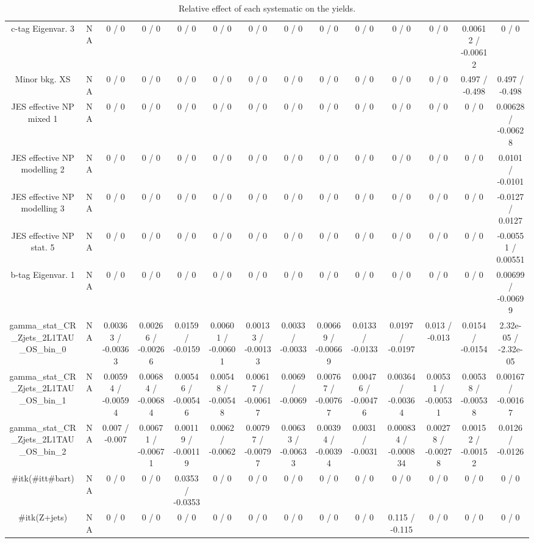 \documentclass[10pt]{article}
\begin{document}
\begin{table}[htbp]
\begin{center}
\begin{tabular}{|c|c|c|c|c|c|c|c|c|c|c|c|c|c|}
  c-tag Eigenvar. 3 &    NA    & 0 / 0 & 0 / 0 & 0 / 0 & 0 / 0 & 0 / 0 & 0 / 0 & 0 / 0 & 0 / 0 & 0 / 0 & 0 / 0 & 0.00612 / -0.00612 & 0 / 0 \\ 
  Minor bkg. XS &    NA    & 0 / 0 & 0 / 0 & 0 / 0 & 0 / 0 & 0 / 0 & 0 / 0 & 0 / 0 & 0 / 0 & 0 / 0 & 0 / 0 & 0.497 / -0.498 & 0.497 / -0.498 \\ 
  JES effective NP mixed 1 &    NA    & 0 / 0 & 0 / 0 & 0 / 0 & 0 / 0 & 0 / 0 & 0 / 0 & 0 / 0 & 0 / 0 & 0 / 0 & 0 / 0 & 0 / 0 & 0.00628 / -0.00628 \\ 
  JES effective NP modelling 2 &    NA    & 0 / 0 & 0 / 0 & 0 / 0 & 0 / 0 & 0 / 0 & 0 / 0 & 0 / 0 & 0 / 0 & 0 / 0 & 0 / 0 & 0 / 0 & 0.0101 / -0.0101 \\ 
  JES effective NP modelling 3 &    NA    & 0 / 0 & 0 / 0 & 0 / 0 & 0 / 0 & 0 / 0 & 0 / 0 & 0 / 0 & 0 / 0 & 0 / 0 & 0 / 0 & 0 / 0 & -0.0127 / 0.0127 \\ 
  JES effective NP stat. 5 &    NA    & 0 / 0 & 0 / 0 & 0 / 0 & 0 / 0 & 0 / 0 & 0 / 0 & 0 / 0 & 0 / 0 & 0 / 0 & 0 / 0 & 0 / 0 & -0.00551 / 0.00551 \\ 
  b-tag Eigenvar. 1 &    NA    & 0 / 0 & 0 / 0 & 0 / 0 & 0 / 0 & 0 / 0 & 0 / 0 & 0 / 0 & 0 / 0 & 0 / 0 & 0 / 0 & 0 / 0 & 0.00699 / -0.00699 \\ 
  gamma_stat_CR_Zjets_2L1TAU_OS_bin_0 &    NA    & 0.00363 / -0.00363 & 0.00266 / -0.00266 & 0.0159 / -0.0159 & 0.00601 / -0.00601 & 0.00133 / -0.00133 & 0.0033 / -0.0033 & 0.00669 / -0.00669 & 0.0133 / -0.0133 & 0.0197 / -0.0197 & 0.013 / -0.013 & 0.0154 / -0.0154 & 2.32e-05 / -2.32e-05 \\ 
  gamma_stat_CR_Zjets_2L1TAU_OS_bin_1 &    NA    & 0.00594 / -0.00594 & 0.00684 / -0.00684 & 0.00546 / -0.00546 & 0.00548 / -0.00548 & 0.00617 / -0.00617 & 0.0069 / -0.0069 & 0.00767 / -0.00767 & 0.00476 / -0.00476 & 0.00364 / -0.00364 & 0.00531 / -0.00531 & 0.00538 / -0.00538 & 0.00167 / -0.00167 \\ 
  gamma_stat_CR_Zjets_2L1TAU_OS_bin_2 &    NA    & 0.007 / -0.007 & 0.00671 / -0.00671 & 0.00119 / -0.00119 & 0.0062 / -0.0062 & 0.00797 / -0.00797 & 0.00633 / -0.00633 & 0.00394 / -0.00394 & 0.0031 / -0.0031 & 0.000834 / -0.000834 & 0.00278 / -0.00278 & 0.00152 / -0.00152 & 0.0126 / -0.0126 \\ 
  #it{k}(#it{t#bar{t}}) &    NA    & 0 / 0 & 0 / 0 & 0.0353 / -0.0353 & 0 / 0 & 0 / 0 & 0 / 0 & 0 / 0 & 0 / 0 & 0 / 0 & 0 / 0 & 0 / 0 & 0 / 0 \\ 
  #it{k}(Z+jets) &    NA    & 0 / 0 & 0 / 0 & 0 / 0 & 0 / 0 & 0 / 0 & 0 / 0 & 0 / 0 & 0 / 0 & 0.115 / -0.115 & 0 / 0 & 0 / 0 & 0 / 0 \\ 
\hline 
\end{tabular} 
\caption{Relative effect of each systematic on the yields.} 
\end{center} 
\end{table} 
\end{document}

